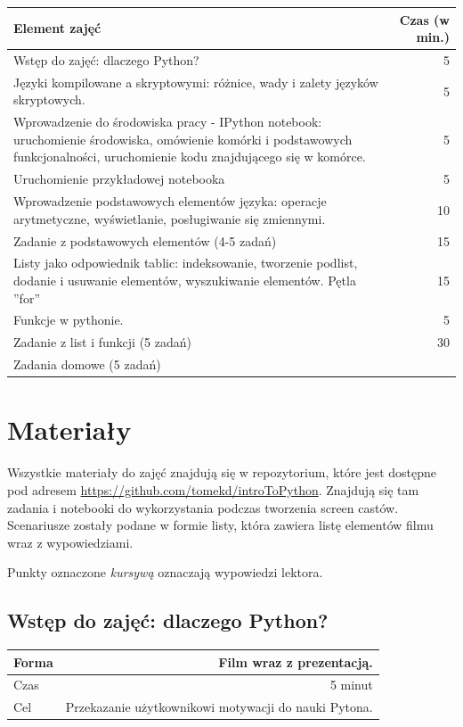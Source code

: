 \documentclass{mwart}
\begin{document}
\begin{center}
  \begin{tabular}{p{10cm}r}
  \toprule
  \textbf{Element zajęć}  & \textbf{Czas (w min.)}   \\
  \midrule
  Wstęp do zajęć: dlaczego Python? & 5 \\
  \midrule
  Języki kompilowane  a skryptowymi: różnice, wady i zalety języków skryptowych. & 5 \\
  \midrule
  Wprowadzenie do środowiska pracy - IPython notebook: uruchomienie środowiska, omówienie
  komórki i podstawowych funkcjonalności, uruchomienie kodu znajdującego się w komórce.
  & 5 \\
  \midrule
  Uruchomienie przykładowej notebooka & 5 \\
  \midrule
  Wprowadzenie podstawowych elementów języka: operacje arytmetyczne, wyświetlanie,
  posługiwanie się zmiennymi. & 10 \\
  \midrule
  Zadanie z podstawowych elementów (4-5 zadań) & 15 \\
  \midrule
  Listy jako odpowiednik tablic: indeksowanie, tworzenie podlist, dodanie i usuwanie
  elementów, wyszukiwanie elementów. Pętla ''for'' & 15 \\
  \midrule
  Funkcje w pythonie. & 5 \\
  \midrule
  Zadanie z list i funkcji (5 zadań) & 30 \\
  \midrule
  Zadania domowe (5 zadań) & \\
  \bottomrule
\end{tabular}
\end{center}

\section{Materiały}
Wszystkie materiały do zajęć znajdują się w repozytorium, które jest dostępne pod adresem
\href{https://github.com/tomekd/introToPython}{https://github.com/tomekd/introToPython}.
Znajdują się tam zadania i  notebooki do wykorzystania podczas tworzenia screen castów.
Scenariusze zostały podane w formie listy, która zawiera listę elementów
filmu wraz z wypowiedziami.

Punkty oznaczone \emph{kursywą} oznaczają wypowiedzi lektora.


\subsection{Wstęp do zajęć: dlaczego Python?}
\begin{center}
  \begin{tabular}{lr}
    \toprule
    Forma & Film wraz z prezentacją.\\
    \midrule
    Czas & 5 minut \\
    Cel &  Przekazanie użytkownikowi motywacji do nauki Pytona. \\
    \bottomrule
  \end{tabular}
\end{center}
\end{document}
